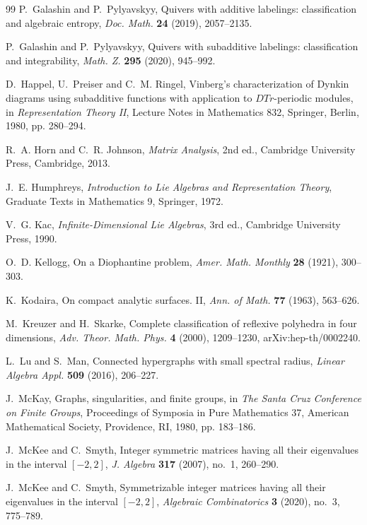 \documentclass[11pt,a4paper]{article}
\theoremstyle{definition}
\theoremstyle{plain}
\begin{document}
\begin{thebibliography}{99}
P.~Galashin and P.~Pylyavskyy, Quivers with additive labelings: classification and algebraic entropy, \emph{Doc. Math.} \textbf{24} (2019), 2057--2135.

P.~Galashin and P.~Pylyavskyy, Quivers with subadditive labelings: classification and integrability, \emph{Math. Z.} \textbf{295} (2020), 945--992.

D.~Happel, U.~Preiser and C.~M. Ringel, Vinberg's characterization of Dynkin diagrams using subadditive functions with application to $DTr$-periodic modules, in \emph{Representation Theory II}, Lecture Notes in Mathematics 832, Springer, Berlin, 1980, pp. 280--294.

R.~A. Horn and C.~R. Johnson, \emph{Matrix Analysis}, 2nd ed., Cambridge University Press, Cambridge, 2013.

J.~E. Humphreys, \emph{Introduction to Lie Algebras and Representation Theory}, Graduate Texts in Mathematics 9, Springer, 1972.

V.~G. Kac, \emph{Infinite-Dimensional Lie Algebras}, 3rd ed., Cambridge University Press, 1990.

O.~D. Kellogg, On a Diophantine problem, \emph{Amer. Math. Monthly} \textbf{28} (1921), 300--303.

K.~Kodaira, On compact analytic surfaces. II, \emph{Ann. of Math.} \textbf{77} (1963), 563--626.

M.~Kreuzer and H.~Skarke, Complete classification of reflexive polyhedra in four dimensions, \emph{Adv. Theor. Math. Phys.} \textbf{4} (2000), 1209--1230, arXiv:hep-th/0002240.


L.~Lu and S.~Man, Connected hypergraphs with small spectral radius, \emph{Linear Algebra Appl.} \textbf{509} (2016), 206--227.

J.~McKay, Graphs, singularities, and finite groups, in \emph{The Santa Cruz Conference on Finite Groups}, Proceedings of Symposia in Pure Mathematics 37, American Mathematical Society, Providence, RI, 1980, pp. 183--186.

J.~McKee and C.~Smyth, Integer symmetric matrices having all their eigenvalues in the interval $[-2,2]$, \emph{J. Algebra} \textbf{317} (2007), no.~1, 260--290.

J.~McKee and C.~Smyth, Symmetrizable integer matrices having all their eigenvalues in the interval $[-2,2]$, \emph{Algebraic Combinatorics} \textbf{3} (2020), no.~3, 775--789.


\end{thebibliography}
\end{document}
